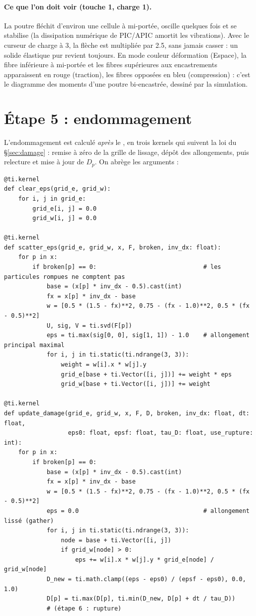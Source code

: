 \documentclass[11pt,a4paper]{article}
\newcommand{\code}[1]{\texttt{\detokenize{#1}}}
\begin{document}
\paragraph{Ce que l'on doit voir (touche 1, charge 1).} La poutre fléchit d'environ une cellule
à mi-portée, oscille quelques fois et se stabilise (la dissipation numérique de PIC/APIC amortit
les vibrations). Avec le curseur de charge à 3, la flèche est multipliée par 2.5, sans jamais casser : un solide
élastique pur revient toujours. En mode couleur \og déformation \fg{} (Espace), la fibre
inférieure à mi-portée et les fibres supérieures aux encastrements apparaissent en rouge
(traction), les fibres opposées en bleu (compression) : c'est le diagramme des moments d'une
poutre bi-encastrée, dessiné par la simulation.

\section{Étape 5 : endommagement}

L'endommagement est calculé \emph{après} le \code{G2P_solid}, en trois kernels qui suivent la loi du
\S\ref{sec:damage} : remise à zéro de la grille de lissage, dépôt des allongements, puis relecture
et mise à jour de $D_p$. On abrège les arguments \code{ti.template()} :

\begin{lstlisting}
@ti.kernel
def clear_eps(grid_e, grid_w):
    for i, j in grid_e:
        grid_e[i, j] = 0.0
        grid_w[i, j] = 0.0

@ti.kernel
def scatter_eps(grid_e, grid_w, x, F, broken, inv_dx: float):
    for p in x:
        if broken[p] == 0:                              # les particules rompues ne comptent pas
            base = (x[p] * inv_dx - 0.5).cast(int)
            fx = x[p] * inv_dx - base
            w = [0.5 * (1.5 - fx)**2, 0.75 - (fx - 1.0)**2, 0.5 * (fx - 0.5)**2]
            U, sig, V = ti.svd(F[p])
            eps = ti.max(sig[0, 0], sig[1, 1]) - 1.0    # allongement principal maximal
            for i, j in ti.static(ti.ndrange(3, 3)):
                weight = w[i].x * w[j].y
                grid_e[base + ti.Vector([i, j])] += weight * eps
                grid_w[base + ti.Vector([i, j])] += weight

@ti.kernel
def update_damage(grid_e, grid_w, x, F, D, broken, inv_dx: float, dt: float,
                  eps0: float, epsf: float, tau_D: float, use_rupture: int):
    for p in x:
        if broken[p] == 0:
            base = (x[p] * inv_dx - 0.5).cast(int)
            fx = x[p] * inv_dx - base
            w = [0.5 * (1.5 - fx)**2, 0.75 - (fx - 1.0)**2, 0.5 * (fx - 0.5)**2]
            eps = 0.0                                   # allongement lissé (gather)
            for i, j in ti.static(ti.ndrange(3, 3)):
                node = base + ti.Vector([i, j])
                if grid_w[node] > 0:
                    eps += w[i].x * w[j].y * grid_e[node] / grid_w[node]
            D_new = ti.math.clamp((eps - eps0) / (epsf - eps0), 0.0, 1.0)
            D[p] = ti.max(D[p], ti.min(D_new, D[p] + dt / tau_D))
            # (étape 6 : rupture)
\end{lstlisting}
\end{document}
